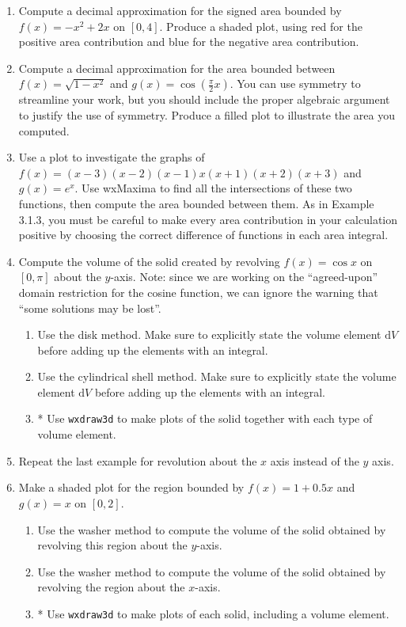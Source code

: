 \documentclass[10.5pt,twoside]{report}
\theoremstyle{definition}
\begin{document}
\begin{enumerate}

\item  Compute a decimal approximation for the signed area bounded by $f(x)=-x^2+2x$ on $[0,4]$.  Produce a shaded plot, using red for the positive area contribution and blue for the negative area contribution.

\item  Compute a decimal approximation for the area bounded between $f(x)=\sqrt{1-x^2}$ and $g(x)=\cos{(\frac{\pi}{2} x)}$.  You can use symmetry to streamline your work, but you should include the proper algebraic argument to justify the use of symmetry.  Produce a filled plot to illustrate the area you computed.

\item  Use a plot to investigate the graphs of $f(x)=(x-3)(x-2)(x-1)x(x+1)(x+2)(x+3)$ and $g(x)=e^x$.  Use wxMaxima to find all the intersections of these two functions, then compute the area bounded between them.  As in Example 3.1.3, you must be careful to make every area contribution in your calculation positive by choosing the correct difference of functions in each area integral.



\item Compute the volume of the solid created by revolving $f(x)=\cos{x}$ on $[0,\pi]$ about the $y$-axis.  Note:  since we are working on the ``agreed-upon'' domain restriction for the cosine function, we can ignore the warning that ``some solutions may be lost''.
  \begin{enumerate}
   \item Use the disk method.  Make sure to explicitly state the volume element $\mathrm{d}V$ before adding up the elements with an integral.
   \item Use the cylindrical shell method.  Make sure to explicitly state the volume element $\mathrm{d}V$ before adding up the elements with an integral.
   \item * Use \verb|wxdraw3d| to make plots of the solid together with each type of volume element.
  \end{enumerate}

\item Repeat the last example for revolution about the $x$ axis instead of the $y$ axis.

\item Make a shaded plot for the region bounded by $f(x)=1+0.5x$ and $g(x)=x$ on $[0,2]$.
 \begin{enumerate}
  \item  Use the washer method to compute the volume of the solid obtained by revolving this region about the $y$-axis.
  \item  Use the washer method to compute the volume of the solid obtained by revolving the region about the $x$-axis.
  \item * Use \verb|wxdraw3d| to make plots of each solid, including a volume element.
 \end{enumerate}


\end{enumerate}
\end{document}
